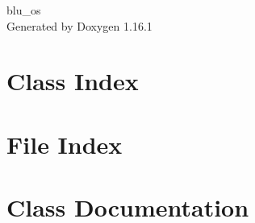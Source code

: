 \documentclass[twoside]{book}
\newcommand{\+}{\discretionary{\mbox{\scriptsize$\hookleftarrow$}}{}{}}
\newcommand{\clearemptydoublepage}{%
    \newpage{\pagestyle{empty}\cleardoublepage}%
  }
\begin{document}
  \raggedbottom
    \hypersetup{pageanchor=false,
                bookmarksnumbered=true,
                pdfencoding=unicode
               }
  \begin{titlepage}
  \vspace*{7cm}
  \begin{center}%
  {\Large blu\+\_\+os}\\
  \vspace*{1cm}
  {\large Generated by Doxygen 1.16.1}\\
  \end{center}
  \end{titlepage}
  \clearemptydoublepage
  \tableofcontents
  \clearemptydoublepage
  \hypersetup{pageanchor=true}

\chapter{Class Index}

\chapter{File Index}

\chapter{Class Documentation}











\end{document}
